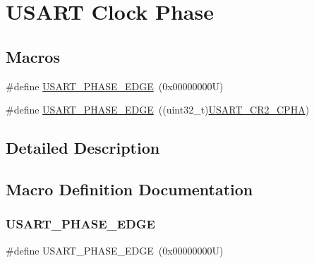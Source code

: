 \hypertarget{group___u_s_a_r_t___clock___phase}{}\section{U\+S\+A\+RT Clock Phase}
\label{group___u_s_a_r_t___clock___phase}
\subsection*{Macros}
\begin{DoxyCompactItemize}
\item 
\#define \hyperlink{group___u_s_a_r_t___clock___phase_gab050873df3eb3844f973e61681e02e6a}{U\+S\+A\+R\+T\+\_\+\+P\+H\+A\+S\+E\+\_\+E\+D\+GE}~(0x00000000\+U)
\item 
\#define \hyperlink{group___u_s_a_r_t___clock___phase_ga080cff411c6cefbb511162fcc91c43ec}{U\+S\+A\+R\+T\+\_\+\+P\+H\+A\+S\+E\+\_\+E\+D\+GE}~((uint32\+\_\+t)\hyperlink{group___peripheral___registers___bits___definition_ga362976ce813e58310399d113d2cf09cb}{U\+S\+A\+R\+T\+\_\+\+C\+R2\+\_\+\+C\+P\+HA})
\end{DoxyCompactItemize}


\subsection{Detailed Description}


\subsection{Macro Definition Documentation}
\mbox{\label{group___u_s_a_r_t___clock___phase_gab050873df3eb3844f973e61681e02e6a}} 
\subsubsection{\texorpdfstring{U\+S\+A\+R\+T\+\_\+\+P\+H\+A\+S\+E\+\_\+E\+D\+GE}{USART\_PHASE\_1EDGE}}
{\footnotesize\ttfamily \#define U\+S\+A\+R\+T\+\_\+\+P\+H\+A\+S\+E\+\_\+E\+D\+GE~(0x00000000\+U)}

